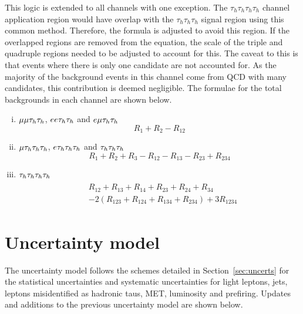 This logic is extended to all channels with one exception.
The $\tau_h \tau_h \tau_h \tau_h$ channel application region would have overlap with the $\tau_h \tau_h \tau_h$ signal region using this common method. 
Therefore, the formula is adjusted to avoid this region.
If the overlapped regions are removed from the equation, the scale of the triple and quadruple regions needed to be adjusted to account for this.
The caveat to this is that events where there is only one \jtth candidate are not accounted for.
As the majority of the background events in this channel come from \ac{QCD} with many \jtth candidates, this contribution is deemed negligible.
The formulae for the total \jtth backgrounds in each channel are shown below. \\

\begin{enumerate}[i)]
\item $\mu\mu\tau_{h}\tau_{h}$, $ee\tau_{h}\tau_{h}$ and $e\mu\tau_{h}\tau_{h}$
\begin{equation}
R_1 + R_2 - R_{12}
\end{equation}

\item $\mu\tau_{h}\tau_{h}\tau_{h}$, $e\tau_{h}\tau_{h}\tau_{h}$ and $\tau_{h}\tau_{h}\tau_{h}$
\begin{equation}
R_1 + R_2 + R_3 - R_{12} - R_{13} - R_{23} + R_{234}
\end{equation}

\item $\tau_{h}\tau_{h}\tau_{h}\tau_{h}$
\begin{align}
\begin{split}
&R_{12} + R_{13} + R_{14} + R_{23} + R_{24} + R_{34} \\
&- 2(R_{123} + R_{124} + R_{134} + R_{234}) + 3R_{1234}
\end{split}
\end{align}
\end{enumerate}
 
\section{Uncertainty model}

The uncertainty model follows the schemes detailed in Section~\ref{sec:uncerts} for the statistical uncertainties and systematic uncertainties for light leptons, jets, leptons misidentified as hadronic taus, MET, luminosity and prefiring.
Updates and additions to the previous uncertainty model are shown below. \\

